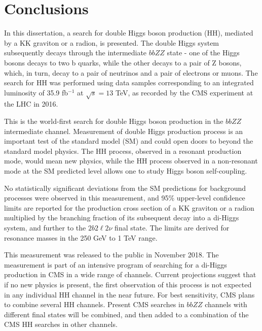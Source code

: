 \chapter{Conclusions}
\label{ch:Conclusions}

In this dissertation, a search for double Higgs boson production (HH), mediated by a KK graviton or a radion, is presented. The double Higgs system subsequently decays through the intermediate $bbZZ$ state - one of the Higgs bosons decays to two b quarks, while the other decays to a pair of Z bosons, which, in turn, decay to a pair of neutrinos and a pair of electrons or muons. The search for HH was performed using data samples corresponding to an integrated luminosity of 35.9 fb$^{-1}$ at $\sqrt s =13$ TeV, as recorded by the CMS experiment at the LHC in 2016. 

This is the world-first search for double Higgs boson production in the $bbZZ$ intermediate channel. Measurement of double Higgs production process is an important test of the standard model (SM) and could open doors to beyond the standard model physics. The HH process, observed in a resonant production mode, would mean new physics, while the HH process observed in a non-resonant mode at the SM predicted level allows one to study Higgs boson self-coupling. 

No statistically significant deviations from the SM predictions for background processes were observed in this measurement, and 95\% upper-level confidence limits are reported for the production cross section of a KK graviton or a radion multiplied by the branching fraction of its subsequent decay into a di-Higgs system, and further to the $2 b 2 \ell 2 \nu$ final state. The limits are derived for resonance masses in the 250 GeV to 1 TeV range.

This measurement was released to the public in November 2018. The measurement is part of an intensive program of searching for a di-Higgs production in CMS in a wide range of channels. Current projections suggest that if no new physics is present, the first observation of this process is not expected in any individual HH channel in the near future. For best sensitivity, CMS plans to combine several HH channels. Present CMS searches in $bbZZ$ channels with different final states will be combined, and then added to a combination of the CMS HH searches in other channels.
